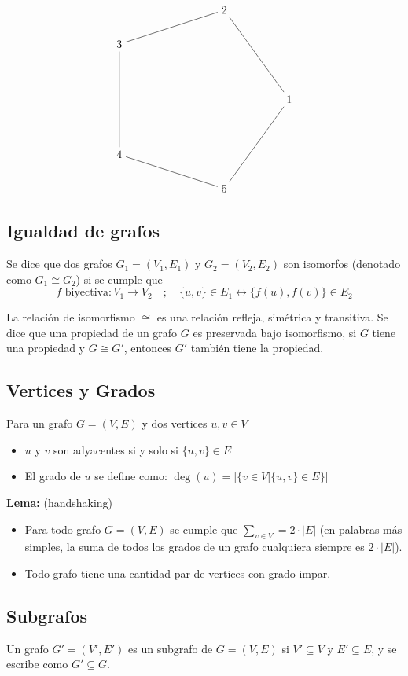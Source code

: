 \documentclass[../main.tex]{subfiles}
\begin{document}
\[
    \begin{tikzpicture}
        \def \n {5}
        \def \radius {3cm}
        \def \margin {8} %

        \foreach \s in {1,...,\n}{
            \node (\s) at ({360/\n * (\s - 1)}:\radius) {$\s$};
        }
        \draw (1) -- (2);
        \draw (2) -- (3);
        \draw (3) -- (4);
        \draw (4) -- (5);
        \draw (5) -- (1);
    \end{tikzpicture}
\]

\subsection{Igualdad de grafos}
Se dice que dos grafos $G_1 = (V_1, E_1)$ y $G_2 = (V_2, E_2)$ son isomorfos (denotado como $G_1 \cong G_2$) si se cumple que
\[ f \text{ biyectiva}: V_1 \rightarrow V_2 \quad ; \quad \{u,v\} \in E_1 \leftrightarrow \{f(u), f(v)\} \in E_2 \]

La relación de isomorfismo $\cong$ es una relación refleja, simétrica y transitiva. Se dice que una propiedad de un grafo $G$ es preservada bajo isomorfismo, si $G$ tiene una propiedad y $G \cong G'$, entonces $G'$ también tiene la propiedad.

\subsection{Vertices y Grados}
Para un grafo $G = (V,E)$ y dos vertices $u,v \in V$
\begin{itemize}
    \item $u$ y $v$ son adyacentes si y solo si $\{u,v\} \in E$
    \item El grado de $u$ se define como: $\deg(u) = |\{ v \in V | \{u,v\} \in E \}|$
\end{itemize}

\textbf{Lema:} (handshaking)
\begin{itemize}
    \item Para todo grafo $G = (V,E)$ se cumple que $\sum_{v \in V} = 2 \cdot |E|$ (en palabras más simples, la suma de todos los grados de un grafo cualquiera siempre es $2 \cdot |E|$).
    \item Todo grafo tiene una cantidad par de vertices con grado impar.
\end{itemize}

\subsection{Subgrafos}
Un grafo $G' = (V',E')$ es un subgrafo de $G = (V,E)$ si $V' \subseteq V$ y $E' \subseteq E$, y se escribe como $G' \subseteq G$.
\end{document}
